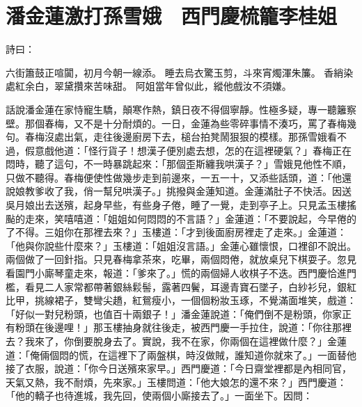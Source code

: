 %

\chapter{潘金蓮激打孫雪娥　西門慶梳籠李桂姐}

\begin{showcontents}{}


詩曰：

六街簫鼓正喧闐，初月今朝一線添。
睡去烏衣驚玉剪，斗來宵燭渾朱簾。
香綃染處紅余白，翠黛攢來苦味甜。
阿姐當年曾似此，縱他戲汝不須嫌。

話說潘金蓮在家恃寵生驕，顛寒作熱，鎮日夜不得個寧靜。性極多疑，專一聽籬察壁。那個春梅，又不是十分耐煩的。一日，金蓮為些零碎事情不湊巧，罵了春梅幾句。春梅沒處出氣，走往後邊廚房下去，槌台拍凳鬧狠狠的模樣。那孫雪娥看不過，假意戲他道：「怪行貨子！想漢子便別處去想，怎的在這裡硬氣？」春梅正在悶時，聽了這句，不一時暴跳起來：「那個歪斯纏我哄漢子？」雪娥見他性不順，只做不聽得。春梅便使性做幾步走到前邊來，一五一十，又添些話頭，道：「他還說娘教爹收了我，俏一幫兒哄漢子。」挑撥與金蓮知道。金蓮滿肚子不快活。因送吳月娘出去送殯，起身早些，有些身子倦，睡了一覺，走到亭子上。只見孟玉樓搖颭的走來，笑嘻嘻道：「姐姐如何悶悶的不言語？」金蓮道：「不要說起，今早倦的了不得。三姐你在那裡去來？」玉樓道：「才到後面廚房裡走了走來。」金蓮道： 「他與你說些什麼來？」玉樓道：「姐姐沒言語。」金蓮心雖懷恨，口裡卻不說出。兩個做了一回針指。只見春梅拿茶來，吃畢，兩個悶倦，就放桌兒下棋耍子。忽見看園門小廝琴童走來，報道：「爹來了。」慌的兩個婦人收棋子不迭。西門慶恰進門檻，看見二人家常都帶著銀絲鬏髻，露著四鬢，耳邊青寶石墜子，白紗衫兒，銀紅比甲，挑線裙子，雙彎尖趫，紅鴛瘦小，一個個粉妝玉琢，不覺滿面堆笑，戲道：「好似一對兒粉頭，也值百十兩銀子！」潘金蓮說道：「俺們倒不是粉頭，你家正有粉頭在後邊哩！」那玉樓抽身就往後走，被西門慶一手拉住，說道：「你往那裡去？我來了，你倒要脫身去了。實說，我不在家，你兩個在這裡做什麼？」金蓮道：「俺倆個悶的慌，在這裡下了兩盤棋，時沒做賊，誰知道你就來了。」一面替他接了衣服，說道：「你今日送殯來家早。」西門慶道：「今日齋堂裡都是內相同官，天氣又熱，我不耐煩，先來家。」玉樓問道：「他大娘怎的還不來？」西門慶道：「他的轎子也待進城，我先回，使兩個小廝接去了。」一面坐下。因問： 
\end{showcontents}
